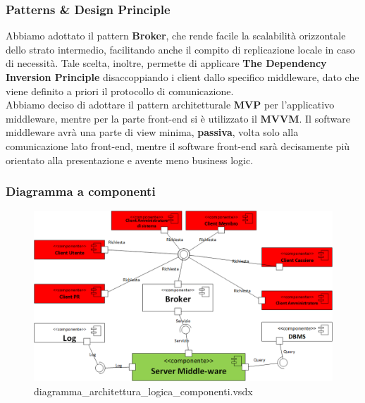 \documentclass[a4paper]{article}
\begin{document}
\subsubsection{Patterns \& Design Principle}
Abbiamo adottato il pattern \textbf{Broker}, che rende facile la scalabilità orizzontale dello strato intermedio, facilitando anche il compito di replicazione locale in caso di necessità. Tale scelta, inoltre, permette di applicare \textbf{The Dependency Inversion Principle} disaccoppiando i client dallo specifico middleware, dato che viene definito a priori il protocollo di comunicazione.\\Abbiamo deciso di adottare il pattern architetturale \textbf{MVP} per l'applicativo middleware, mentre per la parte front-end si è utilizzato il \textbf{MVVM}. Il software middleware avrà una parte di view minima, \textbf{passiva}, volta solo alla comunicazione lato front-end, mentre il software front-end sarà decisamente più orientato alla presentazione e avente meno business logic.







\subsubsection{Diagramma a componenti}

\begin{figure}[H]
    \includegraphics[scale=0.55]{Progettazione/diagramma_architettura_logica_componenti.png}
    \centering
    \caption{diagramma\_architettura\_logica\_componenti.vsdx}
\end{figure}
\end{document}
